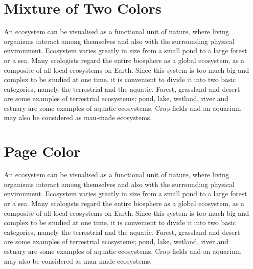 \documentclass[12pt]{article}
\begin{document}
		\section{Mixture of Two Colors}
		
	\textcolor{red!70!blue}{An ecosystem can be visualised as a functional unit of nature, where living 
		organisms interact among themselves and also with the surrounding physical 
		environment. Ecosystem varies greatly in size from a small pond to a large forest or a 
		sea. Many ecologists regard the entire biosphere as a global ecosystem, as a composite 
		of all local ecosystems on Earth. Since this system is too much big and complex to be 
		studied at one time, it is convenient to divide it into two basic categories, namely the 
		terrestrial and the aquatic. Forest, grassland and desert are some examples of terrestrial 
		ecosystems; pond, lake, wetland, river and estuary are some examples of aquatic 
		ecosystems. Crop fields and an aquarium may also be considered as man-made 
		ecosystems.}
	
	\newpage
	
	\section{Page Color}
	
	\pagecolor{Goldenrod! 50}
	
	An ecosystem can be visualised as a functional unit of nature, where living 
	organisms interact among themselves and also with the surrounding physical 
	environment. Ecosystem varies greatly in size from a small pond to a large forest or a 
	sea. Many ecologists regard the entire biosphere as a global ecosystem, as a composite 
	of all local ecosystems on Earth. Since this system is too much big and complex to be 
	studied at one time, it is convenient to divide it into two basic categories, namely the 
	terrestrial and the aquatic. Forest, grassland and desert are some examples of terrestrial 
	ecosystems; pond, lake, wetland, river and estuary are some examples of aquatic 
	ecosystems. Crop fields and an aquarium may also be considered as man-made 
	ecosystems.
	
	
	
\end{document}
